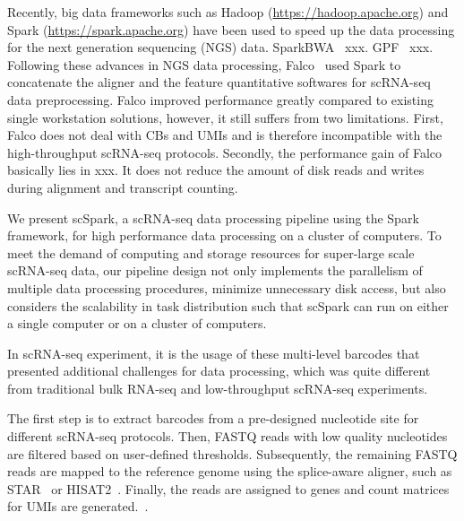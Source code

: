 \documentclass[conference]{IEEEtran}
\begin{document}
Recently, big data frameworks such as Hadoop (\url{https://hadoop.apache.org}) and Spark (\url{https://spark.apache.org}) have been used to speed up the data processing for the next generation sequencing (NGS) data. 
SparkBWA~\cite{Abun2016SparkBWA} xxx.
GPF~\cite{Li2018Highperformance} xxx. 
Following these advances in NGS data processing, Falco~\cite{Yang2017Falco} used Spark to concatenate the aligner and the feature quantitative softwares for scRNA-seq data preprocessing. Falco improved performance greatly compared to existing single workstation solutions, however, it still suffers from two limitations. 
First, Falco does not deal with CBs and UMIs and is therefore incompatible with the high-throughput scRNA-seq protocols.
Secondly, the performance gain of Falco basically lies in xxx. It does not reduce the amount of disk reads and writes during alignment and transcript counting. 

We present scSpark, a scRNA-seq data processing pipeline using the Spark framework, for high performance data processing on a cluster of computers. 
To meet the demand of computing and storage resources for super-large scale scRNA-seq data, 
our pipeline design not only implements the parallelism of multiple data processing procedures, minimize unnecessary disk access, but also considers the scalability in task distribution such that scSpark can run on either a single computer or on a cluster of computers. 



\iffalse

In scRNA-seq experiment, it is the usage of these multi-level barcodes that presented additional challenges for data processing, which was quite different from traditional bulk RNA-seq and low-throughput scRNA-seq experiments. 

The first step is to extract barcodes from a pre-designed nucleotide site for different scRNA-seq protocols. Then, FASTQ reads with low quality nucleotides are filtered based on user-defined thresholds. 
Subsequently, the remaining FASTQ reads are mapped to the reference genome using the splice-aware aligner, such as STAR~\cite{Dobin2013STAR} or HISAT2~\cite{Kim2015HISAT}. 
Finally, the reads are assigned to genes and count matrices for UMIs are generated.~\cite{Parekh2018zUMIs}. 
\end{document}
